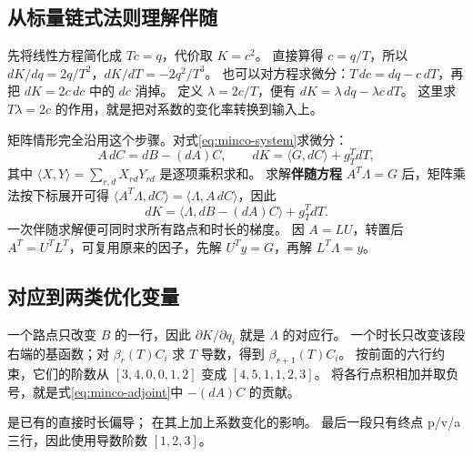 \subsection{从标量链式法则理解伴随}
先将线性方程简化成 $Tc=q$，代价取 $K=c^2$。
直接算得 $c=q/T$，所以 $dK/dq=2q/T^2$，$dK/dT=-2q^2/T^3$。
也可以对方程求微分：$T\,dc=dq-c\,dT$，再把 $dK=2c\,dc$ 中的 $dc$ 消掉。
定义 $\lambda=2c/T$，便有 $dK=\lambda\,dq-\lambda c\,dT$。
这里求 $T\lambda=2c$ 的作用，就是把对系数的变化率转换到输入上。

矩阵情形完全沿用这个步骤。对式\eqref{eq:minco-system}求微分：
\[
 A\,dC=dB-(dA)C,\qquad dK=\langle G,dC\rangle+g_T^TdT,
\]
其中 $\langle X,Y\rangle=\sum_{r,d}X_{rd}Y_{rd}$ 是逐项乘积求和。
求解\textbf{伴随方程} $A^T\Lambda=G$ 后，矩阵乘法按下标展开可得
$\langle A^T\Lambda,dC\rangle=\langle\Lambda,A\,dC\rangle$，因此
\begin{equation}
 dK=\langle\Lambda,dB-(dA)C\rangle+g_T^TdT.
 \label{eq:minco-adjoint}
\end{equation}
一次伴随求解便可同时求所有路点和时长的梯度。
因 $A=LU$，转置后 $A^T=U^TL^T$，可复用原来的因子，先解 $U^Ty=G$，再解 $L^T\Lambda=y$。

\clearpage
\subsection{对应到两类优化变量}
一个路点只改变 $B$ 的一行，因此 $\partial K/\partial q_i$ 就是 $\Lambda$ 的对应行。
一个时长只改变该段右端的基函数；对 $\beta_r(T)C_i$ 求 $T$ 导数，得到 $\beta_{r+1}(T)C_i$。
按前面的六行约束，它们的阶数从 $[3,4,0,0,1,2]$ 变成 $[4,5,1,1,2,3]$。
将各行点积相加并取负号，就是式\eqref{eq:minco-adjoint}中 $-(dA)C$ 的贡献。
\par\noindent
\begin{minipage}{\linewidth}

\end{minipage}
\par
{} 是已有的直接时长偏导； 在其上加上系数变化的影响。
最后一段只有终点 p/v/a 三行，因此使用导数阶数 $[1,2,3]$。

